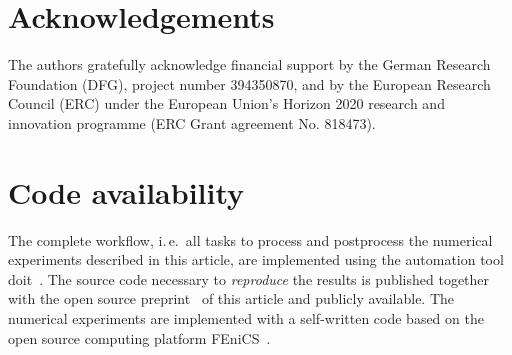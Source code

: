 \documentclass[AMA,STIX1COL,doublespace]{WileyNJD-v2}
\begin{document}
\section*{Acknowledgements}
The authors gratefully acknowledge financial support by the German Research Foundation (DFG), project number 394350870, and by the European Research Council (ERC) under the European Union's Horizon 2020 research and innovation programme (ERC Grant agreement No. 818473).

\section*{Code availability}
The complete workflow, i.\,e.\, all tasks to process and postprocess the numerical experiments described in this article, are implemented using the automation tool doit~\cite{pydoit}.
The source code necessary to \textit{reproduce} the results is published together with the open source preprint~\cite{diercks2022multiscale} of this article and publicly available.
The numerical experiments are implemented with a self-written code based on the open source computing platform FEniCS~\cite{AlnaesBlechta2015a}.

%
\end{document}
